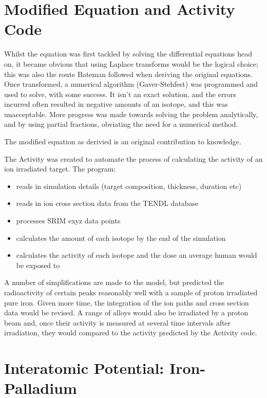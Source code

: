 \section{Modified Equation and Activity Code}

Whilst the equation was first tackled by solving the differential equations head on, it became obvious that using Laplace transforms would be the logical choice; this was also the route Bateman followed when deriving the original equations.  Once transformed, a numerical algorithm (Gaver-Stehfest) was programmed and used to solve, with some success.  It isn't an exact solution, and the errors incurred often resulted in negative amounts of an isotope, and this was unacceptable.  More progress was made towards solving the problem analytically, and by using partial fractions, obviating the need for a numerical method.

The modified equation as derivied is an original contribution to knowledge.

The Activity was created to automate the process of calculating the activity of an ion irradiated target.  The program:

\begin{itemize}
\item reads in simulation details (target composition, thickness, duration etc)
\item reads in ion cross section data from the TENDL database
\item processes SRIM exyz data points
\item calculates the amount of each isotope by the end of the simulation
\item calculates the activity of each isotope and the dose an average human would be exposed to
\end{itemize}

A number of simplifications are made to the model, but predicted the radioactivity of certain peaks reasonably well with a sample of proton irradiated pure iron.  Given more time, the integration of the ion paths and cross section data would be revised.  A range of alloys would also be irradiated by a proton beam and, once their activity is measured at several time intervals after irradiation, they would compared to the activity predicted by the Activity code.

\section{Interatomic Potential: Iron-Palladium}

